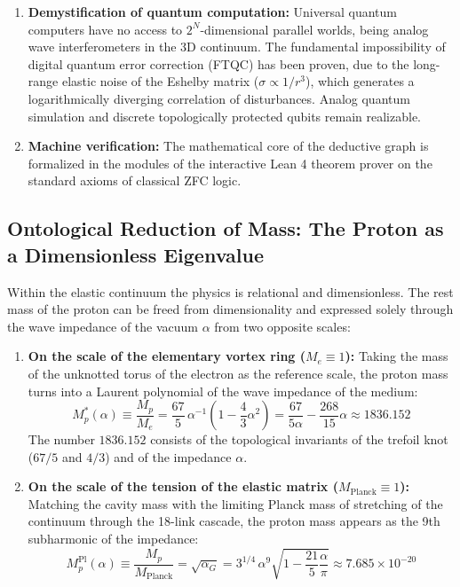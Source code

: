 \documentclass[11pt,a4paper]{article}
\theoremstyle{definition}
\theoremstyle{remark}
\begin{document}
\begin{enumerate}
\begin{itemize}
\end{itemize}
\item \textbf{Demystification of quantum computation:} Universal quantum computers have no access to $2^N$-dimensional parallel worlds, being analog wave interferometers in the 3D continuum. The fundamental impossibility of digital quantum error correction (FTQC) has been proven, due to the long-range elastic noise of the Eshelby matrix ($\sigma \propto 1/r^3$), which generates a logarithmically diverging correlation of disturbances. Analog quantum simulation and discrete topologically protected qubits remain realizable.
\item \textbf{Machine verification:} The mathematical core of the deductive graph is formalized in the modules of the interactive Lean 4 theorem prover on the standard axioms of classical ZFC logic.
\end{enumerate}

\subsection*{Ontological Reduction of Mass: The Proton as a Dimensionless Eigenvalue}

Within the elastic continuum the physics is relational and dimensionless. The rest mass of the proton can be freed from dimensionality and expressed solely through the wave impedance of the vacuum $\alpha$ from two opposite scales:

\begin{enumerate}
\item \textbf{On the scale of the elementary vortex ring ($M_e \equiv 1$):}
Taking the mass of the unknotted torus of the electron as the reference scale, the proton mass turns into a Laurent polynomial of the wave impedance of the medium:
\begin{equation}
M_p^*(\alpha) \equiv \frac{M_p}{M_e} = \frac{67}{5} \, \alpha^{-1} \left( 1 - \frac{4}{3}\alpha^2 \right) = \frac{67}{5\alpha} - \frac{268}{15}\alpha \approx 1836.152
\label{eq:proton_mass_dimensionless_electron}
\end{equation}
The number $1836.152$ consists of the topological invariants of the trefoil knot ($67/5$ and $4/3$) and of the impedance $\alpha$.

\item \textbf{On the scale of the tension of the elastic matrix ($M_{\mathrm{Planck}} \equiv 1$):}
Matching the cavity mass with the limiting Planck mass of stretching of the continuum through the 18-link cascade, the proton mass appears as the 9th subharmonic of the impedance:
\begin{equation}
M_p^{\mathrm{Pl}}(\alpha) \equiv \frac{M_p}{M_{\mathrm{Planck}}} = \sqrt{\alpha_G} = 3^{1/4} \, \alpha^9 \sqrt{1 - \frac{21}{5}\frac{\alpha}{\pi}} \approx 7.685 \times 10^{-20}
\label{eq:proton_mass_dimensionless_planck}
\end{equation}
\end{enumerate}
\end{document}
